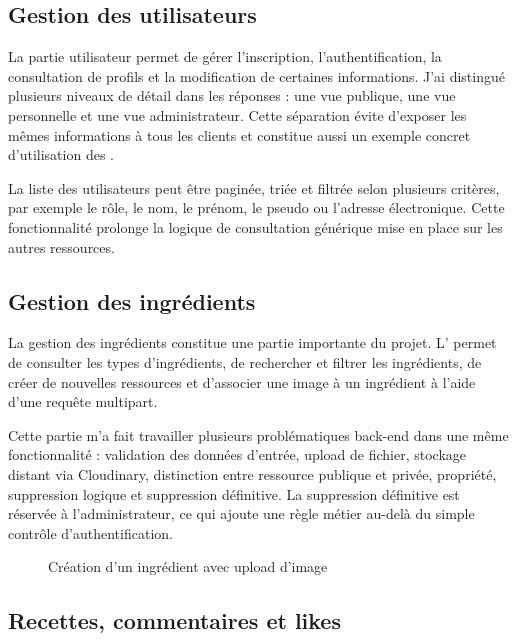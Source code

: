 \subsection{Gestion des utilisateurs}

La partie utilisateur permet de gérer l'inscription, l'authentification, la consultation de profils et la modification de certaines informations. J'ai distingué plusieurs niveaux de détail dans les réponses : une vue publique, une vue personnelle et une vue administrateur. Cette séparation évite d'exposer les mêmes informations à tous les clients et constitue aussi un exemple concret d'utilisation des .

La liste des utilisateurs peut être paginée, triée et filtrée selon plusieurs critères, par exemple le rôle, le nom, le prénom, le pseudo ou l'adresse électronique. Cette fonctionnalité prolonge la logique de consultation générique mise en place sur les autres ressources.

\subsection{Gestion des ingrédients}

La gestion des ingrédients constitue une partie importante du projet. L' permet de consulter les types d'ingrédients, de rechercher et filtrer les ingrédients, de créer de nouvelles ressources et d'associer une image à un ingrédient à l'aide d'une requête multipart.

Cette partie m'a fait travailler plusieurs problématiques back-end dans une même fonctionnalité : validation des données d'entrée, upload de fichier, stockage distant via Cloudinary, distinction entre ressource publique et privée, propriété, suppression logique et suppression définitive. La suppression définitive est réservée à l'administrateur, ce qui ajoute une règle métier au-delà du simple contrôle d'authentification.

\begin{figure}[H]
\centering
{}
\caption{Création d'un ingrédient avec upload d'image}
\label{fig:ingredient-multipart-feastverse}
\end{figure}

\subsection{Recettes, commentaires et likes}

